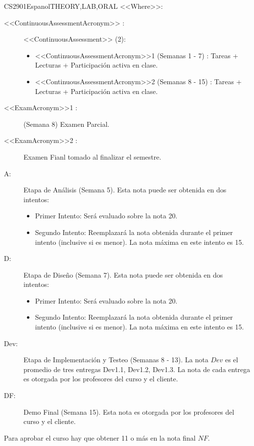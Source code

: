 \begin{evaluation}{CS2901}{Espanol}{THEORY,LAB,ORAL}
  \vspace{2mm}
  \noindent <<Where>>:
  \begin{description}
    \item[<<ContinuousAssessmentAcronym>> :] <<ContinuousAssessment>> (2):
    \begin{itemize}
        \item  <<ContinuousAssessmentAcronym>>1 (Semanas 1 - 7)  : Tareas + Lecturas + Participación activa en clase.
        \item <<ContinuousAssessmentAcronym>>2 (Semanas 8 - 15) : Tareas + Lecturas + Participación activa en clase.
    \end{itemize}
    \item[<<ExamAcronym>>1 :] (Semana 8) Examen Parcial.
    \item[<<ExamAcronym>>2 :] Examen Fianl tomado al finalizar el semestre.
    \item[A:] Etapa de Análisis (Semana 5). Esta nota puede ser obtenida en dos intentos:
      \begin{itemize}
        \item[] Primer Intento: Será evaluado sobre la nota 20.
        \item[] Segundo Intento: Reemplazará la nota obtenida durante el primer intento (inclusive si es menor). La nota máxima en este intento es 15.
      \end{itemize}
    \item[D:] Etapa de Diseño (Semana 7). Esta nota puede ser obtenida en dos intentos:
      \begin{itemize}
        \item[] Primer Intento: Será evaluado sobre la nota 20.
        \item[] Segundo Intento: Reemplazará la nota obtenida durante el primer intento (inclusive si es menor). La nota máxima en este intento es 15.
      \end{itemize}
    \item[Dev:] Etapa de Implementación y Testeo (Semanas 8 - 13). La nota $Dev$ es el promedio de tres entregas Dev1.1, Dev1.2, Dev1.3. La nota de cada entrega es otorgada por los profesores del curso y el cliente.
    \item[DF:] Demo Final (Semana 15). Esta nota es otorgada por los profesores del curso y el cliente.  
  \end{description}
 
  \noindent Para aprobar el curso hay que obtener 11 o más en la nota final $NF$.
  \end{evaluation}
 
